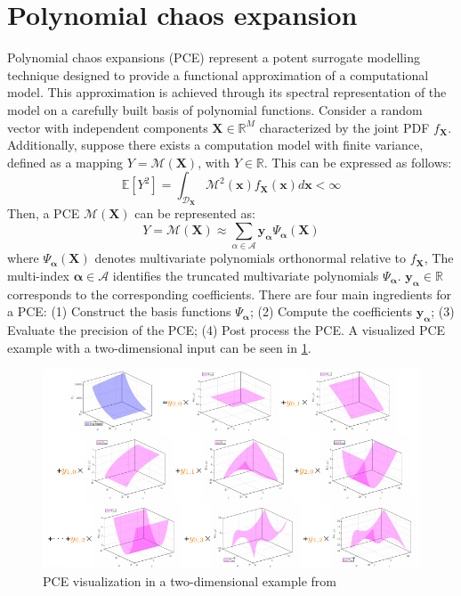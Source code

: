 \section{Polynomial chaos expansion}
Polynomial chaos expansions (PCE) represent a potent surrogate modelling technique designed to provide a functional approximation of a computational model. This approximation is achieved through its spectral representation of the model on a carefully built basis of polynomial functions. Consider a random vector with independent components $\boldsymbol{X} \in \mathbb{R}^{M}$ characterized by the joint \acrshort{PDF} $f_{\boldsymbol{X}}$. Additionally, suppose there exists a computation model with finite variance, defined as a mapping $Y = \mathcal{M}(\boldsymbol{X})$, with $Y \in \mathbb{R}$. This can be expressed as follows:
\begin{equation}
    \mathbb{E}[Y^2] 
    =\int_{\mathcal{D}_{\boldsymbol{X}}}
    \mathcal{M}^2(\boldsymbol{x})f_{\boldsymbol{X}}(\boldsymbol{x})
    d\boldsymbol{x}< \infty 
\end{equation}
Then, a \acrshort{PCE} $\mathcal{M}(\boldsymbol{X})$ can be represented as:
\begin{equation}
\label{eq: PCE_basis}
Y=\mathcal{M}(\boldsymbol{X}) \approx
\sum\limits_{\alpha \in \mathcal{A} }{\boldsymbol{y_{\alpha}} \Psi_{\boldsymbol{\alpha}}(\boldsymbol{X})}
\end{equation}
where $\Psi_{\boldsymbol{\alpha}}(\boldsymbol{X})$ denotes multivariate polynomials orthonormal relative to $f_{\boldsymbol{X}}$, The multi-index $\boldsymbol{\alpha} \in \mathcal{A}$ identifies the truncated multivariate polynomials $\Psi_{\boldsymbol{\alpha}}$. $\boldsymbol{y_{\alpha}} \in \mathbb{R}$ corresponds to the corresponding coefficients. There are four main ingredients for a \acrshort{PCE}: (1) Construct the basis functions $\Psi_{\boldsymbol{\alpha}}$; (2) Compute the coefficients $\boldsymbol{y_{\alpha}}$; (3) Evaluate the precision of the \acrshort{PCE}; (4) Post process the \acrshort{PCE}. A visualized \acrshort{PCE} example with a two-dimensional input can be seen in \cref{fig: PCE_visual}.
\begin{figure}[htbp]
    \centering
    \includegraphics[width = 140mm]{Figures/figure-PCE_visualize.pdf}
    \caption{PCE visualization in a two-dimensional example from \protect\cite{PCE-visual}}
    \label{fig: PCE_visual}
\end{figure}



